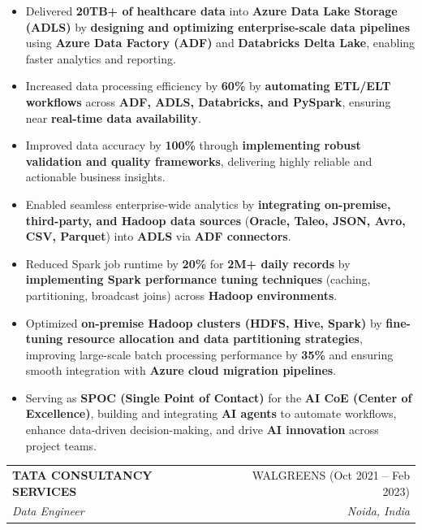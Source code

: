 \documentclass[letterpaper,11pt]{article}
\makeatletter
\newcommand{\resumeItem}[1]{
  \item\small{
    {#1 \vspace{-2pt}}
  }
}
\newcommand{\resumeSubheading}[4]{
  \vspace{-2pt}\item
    \begin{tabular*}{0.97\textwidth}[t]{l@{\extracolsep{\fill}}r}
      \textbf{#1} & #2 \\
      \textit{\small#3} & \textit{\small #4} \\
    \end{tabular*}\vspace{-7pt}
}
\newcommand{\resumeItemListStart}{\begin{itemize}}
\newcommand{\resumeItemListEnd}{\end{itemize}\vspace{-5pt}}
\makeatother
\begin{document}
    \resumeItemListStart
      \resumeItem{Delivered \textbf{20TB+ of healthcare data} into \textbf{Azure Data Lake Storage (ADLS)} by \textbf{designing and optimizing enterprise-scale data pipelines} using \textbf{Azure Data Factory (ADF)} and \textbf{Databricks Delta Lake}, enabling faster analytics and reporting.}
      \resumeItem{Increased data processing efficiency by \textbf{60\%} by \textbf{automating ETL/ELT workflows} across \textbf{ADF, ADLS, Databricks, and PySpark}, ensuring near \textbf{real-time data availability}.}
      \resumeItem{Improved data accuracy by \textbf{100\%} through \textbf{implementing robust validation and quality frameworks}, delivering highly reliable and actionable business insights.}
      \resumeItem{Enabled seamless enterprise-wide analytics by \textbf{integrating on-premise, third-party, and Hadoop data sources} (\textbf{Oracle, Taleo, JSON, Avro, CSV, Parquet}) into \textbf{ADLS} via \textbf{ADF connectors}.}
      \resumeItem{Reduced Spark job runtime by \textbf{20\%} for \textbf{2M+ daily records} by \textbf{implementing Spark performance tuning techniques} (caching, partitioning, broadcast joins) across \textbf{Hadoop environments}.}
      \resumeItem{Optimized \textbf{on-premise Hadoop clusters (HDFS, Hive, Spark)} by \textbf{fine-tuning resource allocation and data partitioning strategies}, improving large-scale batch processing performance by \textbf{35\%} and ensuring smooth integration with \textbf{Azure cloud migration pipelines}.}
      \resumeItem{Serving as \textbf{SPOC (Single Point of Contact)} for the \textbf{AI CoE (Center of Excellence)}, building and integrating \textbf{AI agents} to automate workflows, enhance data-driven decision-making, and drive \textbf{AI innovation} across project teams.}
    \resumeItemListEnd

  \resumeSubheading
    {TATA CONSULTANCY SERVICES}{WALGREENS (Oct 2021 -- Feb 2023)}
    {Data Engineer}{Noida, India}
\end{document}
